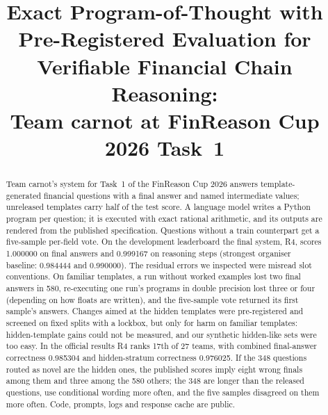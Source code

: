 \documentclass[conference]{IEEEtran}
\begin{document}
\title{Exact Program-of-Thought with Pre-Registered Evaluation for Verifiable Financial Chain Reasoning:\\ Team carnot at FinReason Cup 2026 Task~1}

\author{
}

\maketitle

\begin{abstract}
Team carnot's system for Task~1 of the FinReason Cup 2026 answers template-generated financial questions with a final answer and named intermediate values; unreleased templates carry half of the test score. A language model writes a Python program per question; it is executed with exact rational arithmetic, and its outputs are rendered from the published specification. Questions without a train counterpart get a five-sample per-field vote. On the development leaderboard the final system, R4, scores 1.000000 on final answers and 0.999167 on reasoning steps (strongest organiser baseline: 0.984444 and 0.990000). The residual errors we inspected were misread slot conventions. On familiar templates, a run without worked examples lost two final answers in 580, re-executing one run's programs in double precision lost three or four (depending on how floats are written), and the five-sample vote returned its first sample's answers. Changes aimed at the hidden templates were pre-registered and screened on fixed splits with a lockbox, but only for harm on familiar templates: hidden-template gains could not be measured, and our synthetic hidden-like sets were too easy. In the official results R4 ranks 17th of 27 teams, with combined final-answer correctness 0.985304 and hidden-stratum correctness 0.976025. If the 348 questions routed as novel are the hidden ones, the published scores imply eight wrong finals among them and three among the 580 others; the 348 are longer than the released questions, use conditional wording more often, and the five samples disagreed on them more often. Code, prompts, logs and response cache are public.
\end{abstract}
\end{document}
